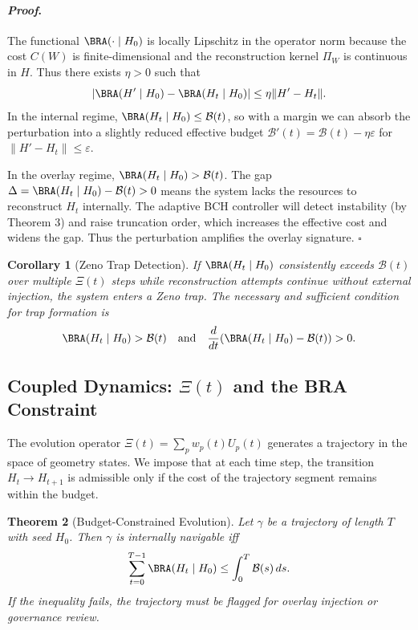 \documentclass[12pt]{article}
\theoremstyle{plain}
\newtheorem{theorem}{Theorem}[section]
\newtheorem{corollary}[theorem]{Corollary}
\theoremstyle{definition}
\theoremstyle{remark}
\renewenvironment{proof}{\paragraph{\textit{Proof}.}}{\hfill$\square$}
\begin{document}
\begin{proof}
The functional $\BRA(\cdot \mid H_0)$ is locally Lipschitz in the operator norm because the cost $C(W)$ is finite-dimensional and the reconstruction kernel $\Pi_W$ is continuous in $H$. Thus there exists $\eta > 0$ such that
\[
|\BRA(H' \mid H_0) - \BRA(H_t \mid H_0)| \le \eta \|H' - H_t\|.
\]
In the internal regime, $\BRA(H_t \mid H_0) \le \mathcal{B}(t)$, so with a margin we can absorb the perturbation into a slightly reduced effective budget $\mathcal{B}'(t) = \mathcal{B}(t) - \eta \varepsilon$ for $\|H'-H_t\| \le \varepsilon$.

In the overlay regime, $\BRA(H_t \mid H_0) > \mathcal{B}(t)$. The gap $\Delta = \BRA(H_t \mid H_0) - \mathcal{B}(t) > 0$ means the system lacks the resources to reconstruct $H_t$ internally. The adaptive BCH controller will detect instability (by Theorem 3) and raise truncation order, which increases the effective cost and widens the gap. Thus the perturbation amplifies the overlay signature.
\end{proof}

\begin{corollary}[Zeno Trap Detection]
If $\BRA(H_t \mid H_0)$ consistently exceeds $\mathcal{B}(t)$ over multiple $\Xi(t)$ steps while reconstruction attempts continue without external injection, the system enters a Zeno trap. The necessary and sufficient condition for trap formation is
\[
\BRA(H_t \mid H_0) > \mathcal{B}(t) \quad \text{and} \quad \frac{d}{dt}\!\left(\BRA(H_t \mid H_0) - \mathcal{B}(t)\right) > 0.
\]
\end{corollary}

\subsection{Coupled Dynamics: $\Xi(t)$ and the BRA Constraint}

The evolution operator $\Xi(t) = \sum_p w_p(t) U_p(t)$ generates a trajectory in the space of geometry states. We impose that at each time step, the transition $H_t \to H_{t+1}$ is admissible only if the cost of the trajectory segment remains within the budget.

\begin{theorem}[Budget-Constrained Evolution]
\statusthm
Let $\gamma$ be a trajectory of length $T$ with seed $H_0$. Then $\gamma$ is internally navigable iff
\[
\sum_{t=0}^{T-1} \BRA(H_t \mid H_0) \le \int_0^T \mathcal{B}(s)\,ds.
\]
If the inequality fails, the trajectory must be flagged for overlay injection or governance review.
\end{theorem}
\end{document}
